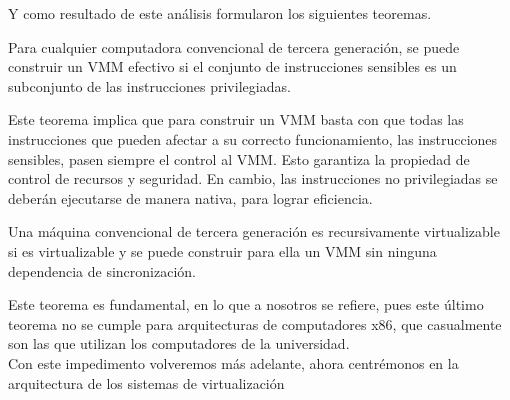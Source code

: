 \noindent Y como resultado de este análisis formularon los siguientes teoremas.
\begin{teorema}
Para cualquier computadora convencional de tercera generación, se puede construir un VMM efectivo si el conjunto de instrucciones sensibles es un subconjunto de las instrucciones privilegiadas.
\end{teorema}

\noindent Este teorema implica que para construir un VMM basta con que todas las instrucciones que pueden afectar a su correcto funcionamiento, las instrucciones sensibles, pasen siempre el control al VMM. Esto garantiza la propiedad de control de recursos y seguridad. En cambio, las instrucciones no privilegiadas se deberán ejecutarse de manera nativa, para lograr eficiencia.

\begin{teorema}
Una máquina convencional de tercera generación es recursivamente virtualizable si es virtualizable y se puede construir para ella un VMM sin ninguna dependencia de sincronización.
\end{teorema}

\noindent Este teorema es fundamental, en lo que a nosotros se refiere, pues este último teorema no se cumple para arquitecturas de computadores x86, que casualmente son las que utilizan los computadores de la universidad.\\

\noindent Con este impedimento volveremos más adelante, ahora centrémonos en la arquitectura de los sistemas de virtualización